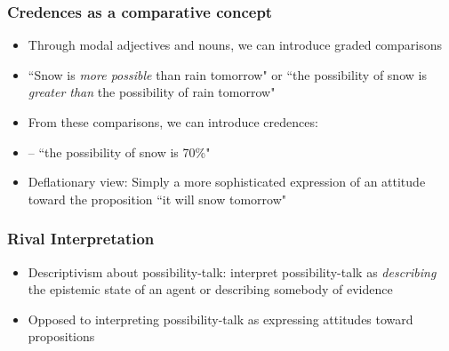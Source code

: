 \begin{frame}
\frametitle{Credences as a comparative concept}

\begin{itemize}[<+->]

\item Through modal adjectives and nouns, we can introduce graded comparisons

\item ``Snow is \textit{more possible} than rain tomorrow" or ``the possibility of snow is \textit{greater than} the possibility of rain tomorrow"

\item From these comparisons, we can introduce credences:

\item[] -- ``the possibility of snow is 70\%" 

\item Deflationary view: Simply a more sophisticated expression of an attitude toward the proposition ``it will snow tomorrow"



\end{itemize}
\end{frame}

\begin{frame}
\frametitle{Rival Interpretation}

\begin{itemize}[<+->]

\item Descriptivism about possibility-talk: interpret possibility-talk as \textit{describing} the epistemic state of an agent or describing somebody of evidence

\item Opposed to interpreting possibility-talk as expressing attitudes toward propositions 

\end{itemize}
\end{frame}




\fi %



















